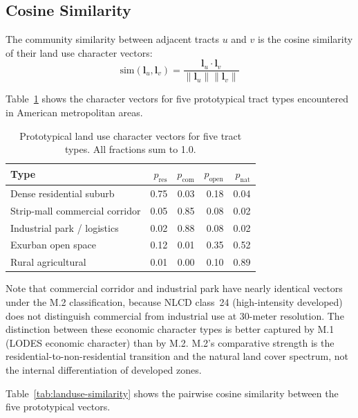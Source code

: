 \subsection{Cosine Similarity}

The community similarity between adjacent tracts $u$ and $v$ is the cosine
similarity of their land use character vectors:
\begin{equation}
  \mathrm{sim}(\mathbf{l}_u, \mathbf{l}_v)
  = \frac{\mathbf{l}_u \cdot \mathbf{l}_v}{\|\mathbf{l}_u\| \|\mathbf{l}_v\|}
  \label{eq:cosine}
\end{equation}

Table~\ref{tab:landuse-prototypes} shows the character vectors for five
prototypical tract types encountered in American metropolitan areas.

\begin{table}[ht]
\centering
\caption{Prototypical land use character vectors for five tract types.
  All fractions sum to 1.0.}
\label{tab:landuse-prototypes}
\small
\begin{tabular}{lrrrr}
\toprule
Type & $p_{\mathrm{res}}$ & $p_{\mathrm{com}}$ & $p_{\mathrm{open}}$ & $p_{\mathrm{nat}}$ \\
\midrule
Dense residential suburb & 0.75 & 0.03 & 0.18 & 0.04 \\
Strip-mall commercial corridor & 0.05 & 0.85 & 0.08 & 0.02 \\
Industrial park / logistics & 0.02 & 0.88 & 0.08 & 0.02 \\
Exurban open space & 0.12 & 0.01 & 0.35 & 0.52 \\
Rural agricultural & 0.01 & 0.00 & 0.10 & 0.89 \\
\bottomrule
\end{tabular}
\end{table}

\noindent
Note that commercial corridor and industrial park have nearly identical
vectors under the M.2 classification, because NLCD class~24 (high-intensity
developed) does not distinguish commercial from industrial use at 30-meter
resolution.
The distinction between these economic character types is better captured
by M.1 (LODES economic character) than by M.2.
M.2's comparative strength is the residential-to-non-residential transition
and the natural land cover spectrum, not the internal differentiation of
developed zones.

Table~\ref{tab:landuse-similarity} shows the pairwise cosine similarity
between the five prototypical vectors.

